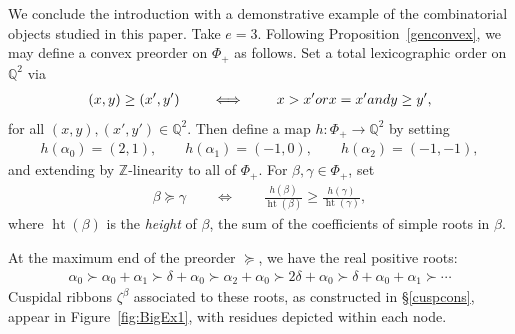 \documentclass[Unicode,ALCO]{cedram}
\newcommand{\height}{\operatorname{ht}}
\newcommand{\0}{{\bar 0}}
\newcommand{\QQ}{{\mathbb Q}}
\newcommand{\ZZ}{{\mathbb Z}}
\def\height{{\operatorname{ht}}}
\def\height{{\operatorname{ht}}}
\begin{document}
\begin{exam}\label{BigEx}
We conclude the introduction with a demonstrative example of the combinatorial objects studied in this paper.
Take \(e=3\). Following Proposition~\ref{genconvex}, we may define a convex preorder on \(\Phi_+\) as follows. Set a total lexicographic order on \(\QQ^2\) via 
\begin{align*}
(x,y) \geq (x',y') \qquad \iff \qquad x>x' \textup{ or } x=x' \textup{ and }y\geq y',
\end{align*}
for all \((x,y), (x',y') \in \QQ^2\). 
Then define a map \(h: \Phi_+ \to \QQ^2\) by setting
\begin{align*}
h(\alpha_0) = (2,1),
\qquad
h(\alpha_1) = (-1,0),
\qquad
h(\alpha_2) = (-1,-1),
\end{align*}
and extending by \(\ZZ\)-linearity to all of \(\Phi_+\). For \(\beta, \gamma \in \Phi_+\), set 
\begin{align*}
\beta \succeq \gamma \qquad \iff \qquad
\frac{h(\beta)}{\height(\beta)} \geq \frac{h(\gamma)}{\height(\gamma)},
\end{align*}
where \(\height(\beta)\) is the {\em height} of \(\beta\), the sum of the coefficients of simple roots in \(\beta\).

At the maximum end of the preorder \(\succeq\), we have the real positive roots:
\begin{align*}
\alpha_0 \succ \alpha_0 + \alpha_1 \succ \delta + \alpha_0 \succ \alpha_2 + \alpha_0 \succ 2 \delta + \alpha_0 \succ \delta + \alpha_0 + \alpha_1 \succ \cdots
\end{align*}
Cuspidal ribbons \(\zeta^\beta\) associated to these roots, as constructed in \S\ref{cuspcons}, appear in Figure~\ref{fig:BigEx1}, with residues depicted within each node.


\end{exam}
\end{document}
